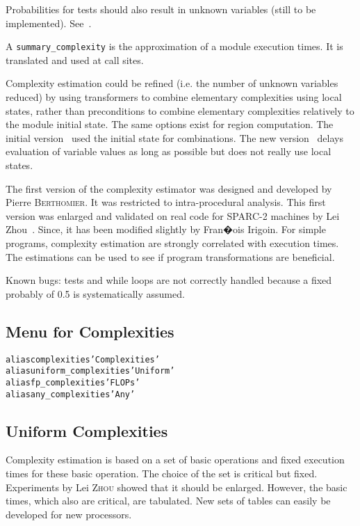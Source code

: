 \documentclass[a4paper]{report}
\newenvironment{PipsMake}{\begin{alltt}}{\end{alltt}}
\begin{document}
Probabilities for tests should also result in
unknown variables (still to be implemented). See~\cite{Z94}.

A \verb+summary_complexity+ is the approximation of a module execution
times. It is translated and used at call sites.

Complexity estimation could be refined (i.e. the number of unknown
variables reduced) by using transformers to combine elementary
complexities using local states, rather than preconditions to combine
elementary complexities relatively to the module initial state. The same
options exist for region computation. The initial version~\cite{Pla90}
used the initial state for combinations. The new version~\cite{CI95}
delays evaluation of variable values as long as possible but does not
really use local states.

The first version of the complexity estimator was designed and
developed by Pierre \textsc{Berthomier}. It was restricted to intra-procedural
analysis. This first version was enlarged and validated on real code for
SPARC-2 machines by Lei Z{\sc hou}~\cite{Z94}. Since, it has been modified
slightly by Fran�ois I{\sc rigoin}. For simple programs, complexity
estimation are strongly correlated with execution times. The estimations
can be used to see if program transformations are beneficial.

Known bugs: tests and while loops are not correctly handled because a
fixed probably of 0.5 is systematically assumed.

\subsection{Menu for Complexities}

\begin{PipsMake}
alias complexities      'Complexities'
alias uniform_complexities      'Uniform'
alias fp_complexities   'FLOPs'
alias any_complexities  'Any'
\end{PipsMake}

\subsection{Uniform Complexities}
\label{subsubsection-uniform-complexities}

Complexity estimation is based on a set of basic operations and fixed
execution times for these basic operation. The choice of the set is
critical but fixed. Experiments by Lei \textsc{Zhou} showed that it should be
enlarged. However, the basic times, which also are critical, are
tabulated. New sets of tables can easily be developed for new
processors.
\end{document}
